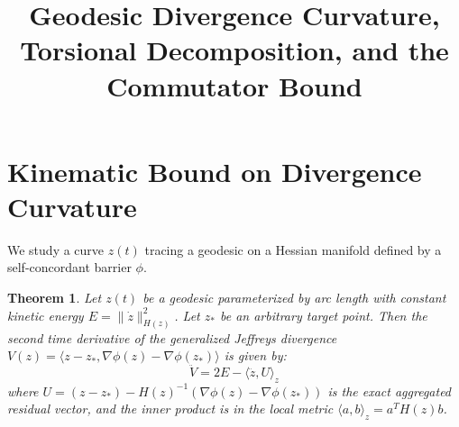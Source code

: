 \documentclass[11pt]{article}
\title{\textbf{Geodesic Divergence Curvature,\\ Torsional Decomposition, and the Commutator Bound}}
\author{}
\date{\vspace{-5ex}}
\newtheorem{theorem}{Theorem}
\begin{document}
\maketitle

\section{Kinematic Bound on Divergence Curvature}
We study a curve $z(t)$ tracing a geodesic on a Hessian manifold defined by a self-concordant barrier $\phi$. 

\begin{theorem}
Let $z(t)$ be a geodesic parameterized by arc length with constant kinetic energy $E = \|\dot{z}\|_{H(z)}^2$. Let $z_*$ be an arbitrary target point. Then the second time derivative of the generalized Jeffreys divergence $V(z) = \langle z - z_*, \nabla \phi(z) - \nabla \phi(z_*) \rangle$ is given by:
\begin{equation}
    \ddot{V} = 2E - \langle \ddot{z}, U \rangle_z
\end{equation}
where $U = (z - z_*) - H(z)^{-1}(\nabla \phi(z) - \nabla \phi(z_*))$ is the exact aggregated residual vector, and the inner product is in the local metric $\langle a, b \rangle_z = a^T H(z) b$.
\end{theorem}
\end{document}
